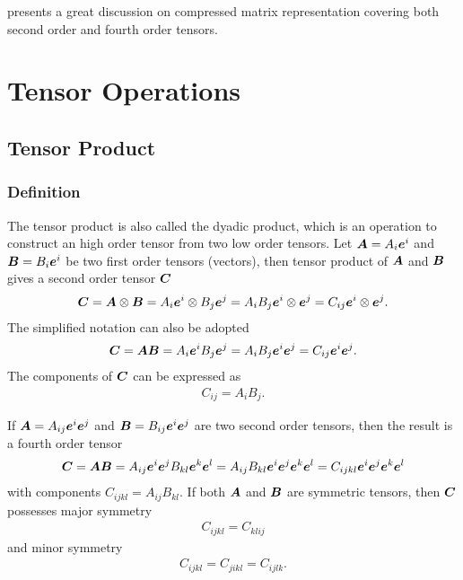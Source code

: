 \cite{Helnwein2001} presents a great discussion on compressed matrix representation covering both second order and fourth order tensors.
\section{Tensor Operations}
\subsection{Tensor Product}
\subsubsection{Definition}
The tensor product is also called the dyadic product, which is an operation to construct an high order tensor from two low order tensors. Let $\bm{A}=A_i\bm{e}^i$ and $\bm{B}=B_i\bm{e}^i$ be two first order tensors (vectors), then tensor product of $\bm{A}$ and $\bm{B}$ gives a second order tensor $\bm{C}$
\begin{gather}
\bm{C}=\bm{A}\otimes\bm{B}=A_i\bm{e}^i\otimes{}B_j\bm{e}^j=A_iB_j\bm{e}^i\otimes{}\bm{e}^j=C_{ij}\bm{e}^i\otimes{}\bm{e}^j.
\end{gather}
The simplified notation can also be adopted
\begin{gather}\label{eq:1st_tensor_product}
\bm{C}=\bm{A}\bm{B}=A_i\bm{e}^iB_j\bm{e}^j=A_iB_j\bm{e}^i\bm{e}^j=C_{ij}\bm{e}^i\bm{e}^j.
\end{gather}
The components of $\bm{C}$ can be expressed as
\begin{gather}
C_{ij}=A_{i}B_{j}.
\end{gather}

If $\bm{A}=A_{ij}\bm{e}^i\bm{e}^j$ and $\bm{B}=B_{ij}\bm{e}^i\bm{e}^j$ are two second order tensors, then the result is a fourth order tensor
\begin{gather}\label{eq:2nd_tensor_product}
\bm{C}=\bm{A}\bm{B}=A_{ij}\bm{e}^i\bm{e}^jB_{kl}\bm{e}^k\bm{e}^l=A_{ij}B_{kl}\bm{e}^i\bm{e}^j\bm{e}^k\bm{e}^l=C_{ijkl}\bm{e}^i\bm{e}^j\bm{e}^k\bm{e}^l
\end{gather}
with components $C_{ijkl}=A_{ij}B_{kl}$. If both $\bm{A}$ and $\bm{B}$ are symmetric tensors, then $\bm{C}$ possesses major symmetry
\begin{gather}
C_{ijkl}=C_{klij}
\end{gather}
and minor symmetry
\begin{gather}
C_{ijkl}=C_{jikl}=C_{ijlk}.
\end{gather}
